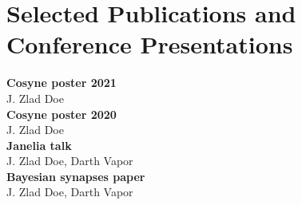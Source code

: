 
\section{Selected Publications and Conference Presentations}
 
\begin{itemize}[leftmargin=0.15in, label={}]
  \small{
    \item{
      
      \textbf{Cosyne poster 2021}{\\J. Zlad Doe}\\

      \textbf{Cosyne poster 2020}{\\J. Zlad Doe}\\

      \textbf{Janelia talk}{\\J. Zlad Doe, Darth Vapor}\\

      \textbf{Bayesian synapses paper}{\\J. Zlad Doe, Darth Vapor}\\


    }
  }
\end{itemize}